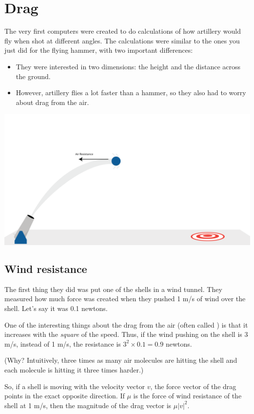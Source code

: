 \chapter{Drag}

The very first computers were created to do calculations of how
artillery would fly when shot at different angles. The calculations
were similar to the ones you just did for the flying
hammer, with two important differences:
\begin{itemize}
\item They were interested in two dimensions: the height and the distance across the ground.
\item However, artillery flies a lot faster than a hammer, so they also had to worry about drag from the air.
\end{itemize}
\includegraphics[width=1\textwidth]{cannon.png}
\section{Wind resistance}

The first thing they did was put one of the shells in a wind tunnel.
They measured how much force was created when they pushed 1 m/s of
wind over the shell. Let's say it was 0.1 newtons.

One of the interesting things about the drag from the air (often
called ) is that it increases with the
\emph{square} of the speed. Thus, if the wind pushing on the shell is
3 m/s, instead of 1 m/s, the resistance is $3^2 \times 0.1 = 0.9$
newtons.

(Why? Intuitively, three times as many air molecules are hitting the
shell and each molecule is hitting it three times harder.)

So, if a shell is moving with the velocity vector $v$, the force
vector of the drag points in the exact opposite direction. If $\mu$ is
the force of wind resistance of the shell at 1 m/s, then the magnitude
of the drag vector is $\mu |v|^2$.

